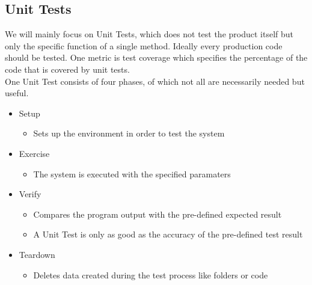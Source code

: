 \documentclass{article}
\begin{document}
 	\subsection{Unit Tests}
 	We will mainly focus on Unit Tests, which does not test the product itself but only the specific function of a single method. Ideally every production code should be tested. One metric is test coverage which specifies the percentage of the code that is covered by unit tests. \\
 	One Unit Test consists of four phases, of which not all are necessarily needed but useful.
 	\begin{itemize}
 		\item{Setup}
 		\begin{itemize}
 			\item{Sets up the environment in order to test the system}
 		\end{itemize}
 		\item{Exercise}
 		\begin{itemize}
 			\item{The system is executed with the specified paramaters}
 		\end{itemize}
 		\item{Verify}
 		\begin{itemize}
 			\item{Compares the program output with the pre-defined expected result}
 			\item{A Unit Test is only as good as the accuracy of the pre-defined test result}
 		\end{itemize}
 		\item{Teardown}
 		\begin{itemize}
 			\item{Deletes data created during the test process like folders or code}
 		\end{itemize}
 	\end{itemize}
\end{document}
